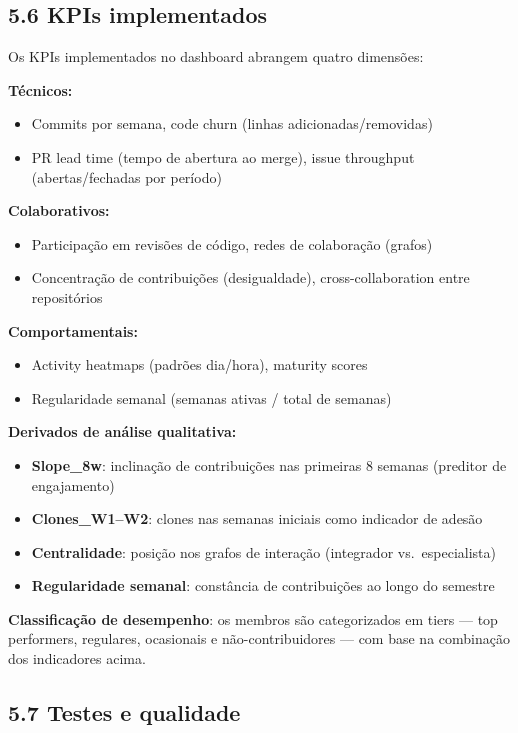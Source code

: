 \documentclass[
	12pt,
	openright,
	oneside,
	a4paper,
	brazil
]{abntex2}
\begin{document}
\subsection*{5.6 KPIs implementados}

Os KPIs implementados no dashboard abrangem quatro dimensões:

\textbf{Técnicos:}
\begin{itemize}
    \item Commits por semana, code churn (linhas adicionadas/removidas)
    \item PR lead time (tempo de abertura ao merge), issue throughput (abertas/fechadas por período)
\end{itemize}

\textbf{Colaborativos:}
\begin{itemize}
    \item Participação em revisões de código, redes de colaboração (grafos)
    \item Concentração de contribuições (desigualdade), cross-collaboration entre repositórios
\end{itemize}

\textbf{Comportamentais:}
\begin{itemize}
    \item Activity heatmaps (padrões dia/hora), maturity scores
    \item Regularidade semanal (semanas ativas / total de semanas)
\end{itemize}

\textbf{Derivados de análise qualitativa:}
\begin{itemize}
    \item \textbf{Slope\_8w}: inclinação de contribuições nas primeiras 8 semanas (preditor de engajamento)
    \item \textbf{Clones\_W1--W2}: clones nas semanas iniciais como indicador de adesão
    \item \textbf{Centralidade}: posição nos grafos de interação (integrador vs.\ especialista)
    \item \textbf{Regularidade semanal}: constância de contribuições ao longo do semestre
\end{itemize}

\textbf{Classificação de desempenho}: os membros são categorizados em tiers --- top performers, regulares, ocasionais e não-contribuidores --- com base na combinação dos indicadores acima.

\subsection*{5.7 Testes e qualidade}
\end{document}
